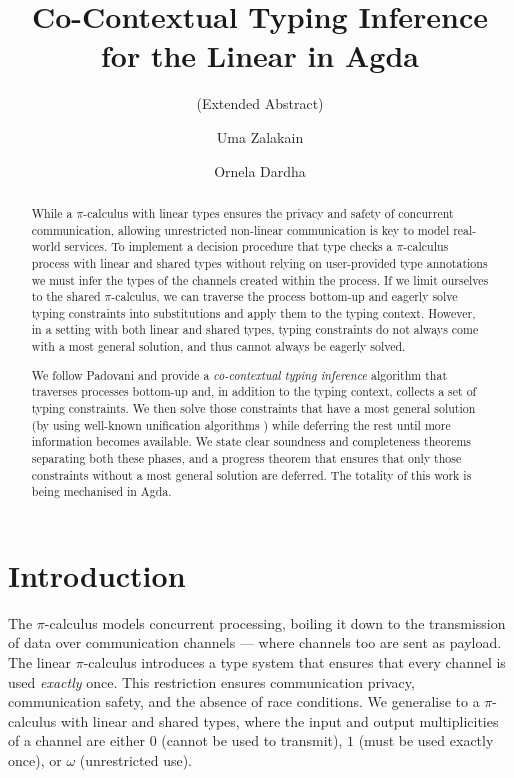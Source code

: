 \documentclass[sigplan,screen,review]{acmart}
\title
[Co-Contextual Typing Inference for the Linear \Picalc{} in Agda]
{Co-Contextual Typing Inference \\ for the Linear \Picalc{} in Agda}
\subtitle{(Extended Abstract)}
\author{Uma Zalakain}
\affiliation{University of Glasgow}
\author{Ornela Dardha}
\affiliation{University of Glasgow}
\newcommand{\picalc}{$\pi$-calculus}
\begin{document}
\begin{abstract}
  While a \picalc{} with linear types ensures the privacy and safety of concurrent communication, allowing unrestricted non-linear communication is key to model real-world services.
  To implement a decision procedure that type checks a \picalc{} process with linear and shared types without relying on user-provided type annotations we must infer the types of the channels created within the process.
  If we limit ourselves to the shared \picalc{}, we can traverse the process bottom-up and eagerly solve typing constraints into substitutions and apply them to the typing context.
  However, in a setting with both linear and shared types, typing constraints do not always come with a most general solution, and thus cannot always be eagerly solved.

  We follow Padovani \cite{Padovani15} and provide a \emph{co-contextual typing inference} \cite{ErdwegBKKM15} algorithm that traverses processes bottom-up and, in addition to the typing context, collects a set of typing constraints.
  We then solve those constraints that have a most general solution (by using well-known unification algorithms \cite{McBride03}) while deferring the rest until more information becomes available.
  We state clear soundness and completeness theorems separating both these phases, and a progress theorem that ensures that only those constraints without a most general solution are deferred.
  The totality of this work is being mechanised in Agda.
\end{abstract}


\maketitle

\section{Introduction}\label{introduction}

The \picalc{} \cite{MilnerPW92a,Milner99} models concurrent processing, boiling it down to the transmission of data over communication channels --- where channels too are sent as payload.
The linear \picalc{} \cite{KobayashiPT96} introduces a type system that ensures that every channel is used \emph{exactly} once.
This restriction ensures communication privacy, communication safety, and the absence of race conditions.
We generalise to a \picalc{} with linear and shared types, where the input and output multiplicities of a channel are either $0$ (cannot be used to transmit), $1$ (must be used exactly once), or $\omega$ (unrestricted use).
\end{document}
